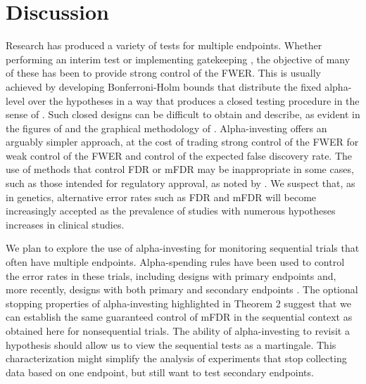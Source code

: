 \documentclass[12pt]{article}
\begin{document}
\section{Discussion}    %

 Research has produced a variety of tests for multiple endpoints.  Whether
 performing an interim test \citep[as in][]{kieser99} or implementing
 gatekeeping \citep[e.g.][]{dmitrienko07}, the objective of many of these has
 been to provide strong control of the FWER.  This is usually achieved by
 developing Bonferroni-Holm bounds that distribute the fixed alpha-level over
 the hypotheses in a way that produces a closed testing procedure in the sense
 of \citet{marcus76}.  Such closed designs can be difficult to obtain and
 describe, as evident in the figures of \citet{kieser99} and the graphical
 methodology of \citet{bretz09}.  Alpha-investing offers an arguably simpler
 approach, at the cost of trading strong control of the FWER for weak control of
 the FWER and control of the expected false discovery rate.  The use of methods
 that control FDR or mFDR may be inappropriate in some cases, such as those
 intended for regulatory approval, as noted by \citet{neuhauser06}.  We suspect
 that, as in genetics, alternative error rates such as FDR and mFDR will become
 increasingly accepted as the prevalence of studies with numerous hypotheses
 increases in clinical studies.


 We plan to explore the use of alpha-investing for monitoring sequential trials
 that often have multiple endpoints.  Alpha-spending rules have been used to
 control the error rates in these trials, including designs with primary
 endpoints \citep[for example,][]{kosorok04} and, more recently, designs with
 both primary and secondary endpoints \citep{tamhane10}.  The optional stopping
 properties of alpha-investing highlighted in Theorem 2 suggest that we can
 establish the same guaranteed control of mFDR in the sequential context as
 obtained here for nonsequential trials.  The ability of alpha-investing to
 revisit a hypothesis should allow us to view the sequential tests as a
 martingale.  This characterization might simplify the analysis of experiments
 that stop collecting data based on one endpoint, but still want to test
 secondary endpoints.


\end{document}
